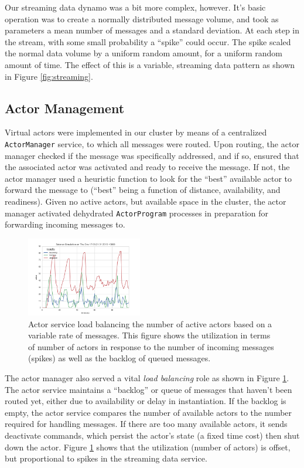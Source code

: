 \documentclass[draftclsnofoot,onecolumn,conference,11pt]{IEEEtran}
\begin{document}
Our streaming data dynamo was a bit more complex, however. It's basic operation was to create a normally distributed message volume, and took as parameters a mean number of messages and a standard deviation. At each step in the stream, with some small probability a ``spike'' could occur. The spike scaled the normal data volume by a uniform random amount, for a uniform random amount of time. The effect of this is a variable, streaming data pattern as shown in Figure \ref{fig:streaming}.

\subsection{Actor Management}

Virtual actors were implemented in our cluster by means of a centralized \texttt{ActorManager} service, to which all messages were routed. Upon routing, the actor manager checked if the message was specifically addressed, and if so, ensured that the associated actor was activated and ready to receive the message. If not, the actor manager used a heuristic function to look for the ``best'' available actor to forward the message to (``best'' being a function of distance, availability, and readiness). Given no active actors, but available space in the cluster, the actor manager activated dehydrated \texttt{ActorProgram} processes in preparation for forwarding incoming messages to.

\begin{figure}[!h]
    \centering
    \includegraphics[width=0.45\textwidth]{balance_sim_queue_lag_zero}
    \caption{Actor service load balancing the number of active actors based on a variable rate of messages. This figure shows the utilization in terms of number of actors in response to the number of incoming messages (spikes) as well as the backlog of queued messages.}
    \label{fig:load_balance}
\end{figure}

The actor manager also served a vital \textit{load balancing} role as shown in Figure \ref{fig:load_balance}. The actor service maintains a ``backlog'' or queue of messages that haven't been routed yet, either due to availability or delay in instantiation. If the backlog is empty, the actor service compares the number of available actors to the number required for handling messages. If there are too many available actors, it sends deactivate commands, which persist the actor's state (a fixed time cost) then shut down the actor. Figure \ref{fig:load_balance} shows that the utilization (number of actors) is offset, but proportional to spikes in the streaming data service.
\end{document}
